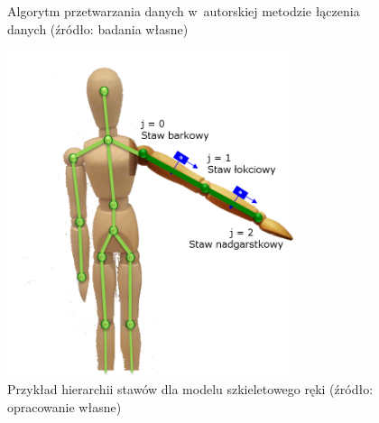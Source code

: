 \begin{figure}[!htb]
	\scalebox{0.7}{
		
	}
	\caption{Algorytm przetwarzania danych w~autorskiej metodzie łączenia danych (źródło: badania własne)}
	\label{fig:hybrid:stepsSequence}						
\end{figure}
\begin{figure}[!htb]
	\centering			
	\includegraphics[width=0.75\textwidth]{images/joints.png}
	\caption{Przykład hierarchii stawów dla modelu szkieletowego ręki (źródło: opracowanie własne)}		
	\label{fig:hybrid:jointsHierarchy}		
\end{figure}

